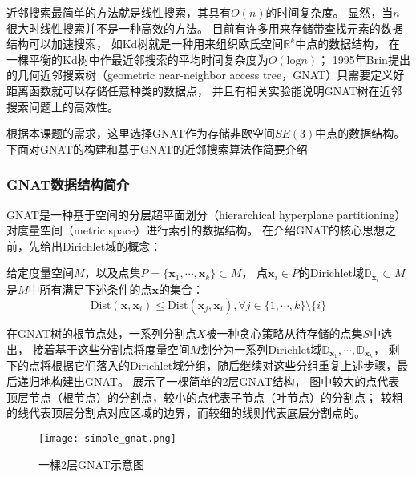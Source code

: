 近邻搜索最简单的方法就是线性搜索，其具有$O(n)$的时间复杂度。
显然，当$n$很大时线性搜索并不是一种高效的方法。
目前有许多用来存储带查找元素的数据结构可以加速搜索，
如Kd树\cite{bentley1975multidimensional}就是一种用来组织欧氏空间$\mathbb{R}^k$中点的数据结构，
在一棵平衡的Kd树中作最近邻搜索的平均时间复杂度为$O(\text{log}n)$；
1995年Brin提出的几何近邻搜索树（geometric near-neighbor access tree，GNAT）\cite{1995Near}只需要定义好距离函数就可以存储任意种类的数据点，
并且有相关实验能说明GNAT树在近邻搜索问题上的高效性。

根据本课题的需求，这里选择GNAT作为存储非欧空间$SE(3)$中点的数据结构。下面对GNAT的构建和基于GNAT的近邻搜索算法作简要介绍

\subsubsection{GNAT数据结构简介}\label{subsubsec:introduction_of_gnat}
GNAT是一种基于空间的分层超平面划分（hierarchical hyperplane partitioning）对度量空间（metric space）进行索引的数据结构。
在介绍GNAT的核心思想之前，先给出Dirichlet域的概念：
\begin{definition}[（Dirichlet域）]
  \label{def:dirichlet_domain}
  给定度量空间$M$，以及点集$P=\{\bm{x}_1,\cdots,\bm{x}_k\} \subset M$，
  点$\bm{x}_i \in P$的Dirichlet域$\mathbb{D}_{\bm{x}_i} \subset M$是$M$中所有满足下述条件的点$\bm{x}$的集合：
  \begin{equation}
    \text{Dist}(\bm{x}, \bm{x}_i) \leq \text{Dist}(\bm{x}_j,\bm{x}_i),\forall j \in \{1,\cdots,k\} \setminus \{i\}
    \label{condition_of_points_in_Dirichlet_domain}
  \end{equation}
\end{definition}

在GNAT树的根节点处，一系列分割点$X$被一种贪心策略从待存储的点集$S$中选出，
接着基于这些分割点将度量空间$M$划分为一系列Dirichlet域$\mathbb{D}_{\bm{x}_1},\cdots,\mathbb{D}_{\bm{x}_k}$，
剩下的点将根据它们落入的Dirichlet域分组，随后继续对这些分组重复上述步骤，最后递归地构建出GNAT。
展示了一棵简单的2层GNAT结构，
图中较大的点代表顶层节点（根节点）的分割点，较小的点代表子节点（叶节点）的分割点；
较粗的线代表顶层分割点对应区域的边界，而较细的线则代表底层分割点的。
\begin{figure}[ht]
  \centering
  \texttt{[image: simple\_gnat.png]}
  \caption{一棵2层GNAT示意图}
  \label{fig:simple_gnat}
\end{figure}

